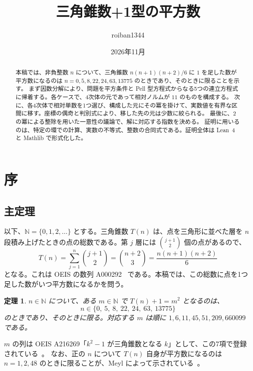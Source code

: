 \documentclass[a4paper,11pt]{ltjsarticle}
\title{三角錐数+1型の平方数}
\author{roiban1344}
\date{2026年11月}
\theoremstyle{jplain}
\newtheorem{theorem}{定理}[section]
\numberwithin{equation}{section}
\numberwithin{table}{section}
\newcommand{\N}{\mathbb{N}}
\begin{document}
\maketitle

\begin{abstract}
本稿では、非負整数 $n$ について、三角錐数 $n(n+1)(n+2)/6$ に $1$ を足した数が平方数になるのは $n=0,5,8,22,24,63,13775$ のときであり、そのときに限ることを示す。
まず因数分解により、問題を平方条件と Pell 型方程式からなる5つの連立方程式に帰着する。各ケースで、4次体の元であって相対ノルムが $11$ のものを構成する。
次に、各4次体で相対単数を1つ選び、構成した元にその冪を掛けて、実数値を有界な区間に移す。座標の偶奇と判別式により、移した先の元は少数に絞られる。
最後に、$2$ の冪による整除を用いた一意性の議論で、解に対応する指数を決める。
証明に用いるのは、特定の環での計算、実数の不等式、整数の合同式である。証明全体は Lean~4 と Mathlib で形式化した。
\end{abstract}

\tableofcontents

\section{序}

\subsection{主定理}

以下、$\N=\{0,1,2,\dots\}$ とする。三角錐数 $T(n)$ は、点を三角形に並べた層を $n$ 段積み上げたときの点の総数である。第 $j$ 層には $\binom{j+1}{2}$ 個の点があるので、
\[
T(n)=\sum_{j=1}^n\binom{j+1}{2}=\binom{n+2}{3}=\frac{n(n+1)(n+2)}6
\]
となる。これは OEIS の数列 A000292~\cite{OEIS} である。本稿では、この総数に点を1つ足した数がいつ平方数になるかを問う。

\begin{theorem}\label{thm:main}
$n\in\N$ について、ある $m\in\N$ で $T(n)+1=m^2$ となるのは、
\[
n\in\{0,\ 5,\ 8,\ 22,\ 24,\ 63,\ 13775\}
\]
のときであり、そのときに限る。対応する $m$ は順に $1,6,11,45,51,209,660099$ である。
\end{theorem}

$m$ の列は OEIS A216269「$k^2-1$ が三角錐数となる $k$」として、この7項で登録されている~\cite{OEIS}。
なお、正の $n$ について $T(n)$ 自身が平方数になるのは $n=1,2,48$ のときに限ることが、Meyl によって示されている~\cite{Meyl1878}。
\end{document}
